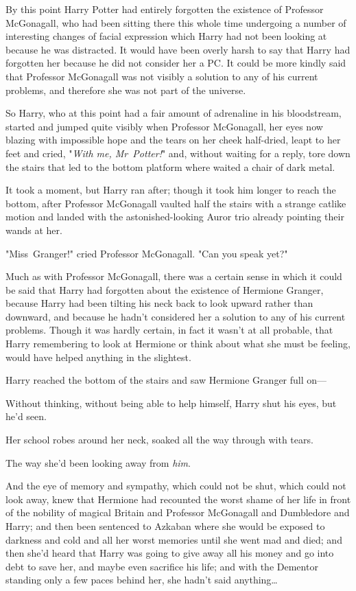 By this point Harry Potter had entirely forgotten the existence of Professor
McGonagall, who had been sitting there this whole time undergoing a number of
interesting changes of facial expression which Harry had not been looking at
because he was distracted. It would have been overly harsh to say that Harry
had forgotten her because he did not consider her a PC. It could be more kindly
said that Professor McGonagall was not visibly a solution to any of his current
problems, and therefore she was not part of the universe.

So Harry, who at this point had a fair amount of adrenaline in his bloodstream,
started and jumped quite visibly when Professor McGonagall, her eyes now
blazing with impossible hope and the tears on her cheek half-dried, leapt to
her feet and cried, "\emph{With me, Mr~Potter!}" and, without waiting for a
reply, tore down the stairs that led to the bottom platform where waited a
chair of dark metal.

It took a moment, but Harry ran after; though it took him longer to reach the
bottom, after Professor McGonagall vaulted half the stairs with a strange
catlike motion and landed with the astonished-looking Auror trio already
pointing their wands at her.

"Miss~Granger!" cried Professor McGonagall. "Can you speak yet?"

Much as with Professor McGonagall, there was a certain sense in which it could
be said that Harry had forgotten about the existence of Hermione Granger,
because Harry had been tilting his neck back to look upward rather than
downward, and because he hadn't considered her a solution to any of his current
problems. Though it was hardly certain, in fact it wasn't at all probable, that
Harry remembering to look at Hermione or think about what she must be feeling,
would have helped anything in the slightest.

Harry reached the bottom of the stairs and saw Hermione Granger full on—

Without thinking, without being able to help himself, Harry shut his eyes, but
he'd seen.

Her school robes around her neck, soaked all the way through with tears.

The way she'd been looking away from \emph{him}.

And the eye of memory and sympathy, which could not be shut, which could not
look away, knew that Hermione had recounted the worst shame of her life in
front of the nobility of magical Britain and Professor McGonagall and
Dumbledore and Harry; and then been sentenced to Azkaban where she would be
exposed to darkness and cold and all her worst memories until she went mad and
died; and then she'd heard that Harry was going to give away all his money and
go into debt to save her, and maybe even sacrifice his life; and with the Dementor
standing only a few paces behind her, she hadn't said anything…

